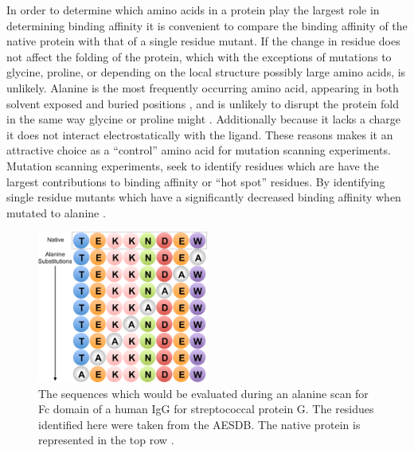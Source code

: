 In order to determine which amino acids in a protein play the largest role in determining binding affinity it is convenient to compare the binding affinity of the native protein with that of a single residue mutant.
If the change in residue does not affect the folding of the protein, which with the exceptions of mutations to glycine, proline, or depending on the local structure possibly large amino acids, is unlikely. 
Alanine is the most frequently occurring amino acid, appearing in both solvent exposed and buried positions \cite{chothia1976nature,rose1985hydrophobicity}, and is unlikely to disrupt the protein fold in the same way glycine or proline might \cite{klapper1977independent}.
Additionally because it lacks a charge it does not interact electrostatically with the ligand.
These reasons makes it an attractive choice as a ``control'' amino acid for mutation scanning experiments.
Mutation scanning experiments, seek to identify residues which are have the largest contributions to binding affinity or ``hot spot'' residues.
By identifying single residue mutants which have a significantly decreased binding affinity when mutated to alanine \cite{cunningham1989high}.
\begin{figure}[h]
\centering
\includegraphics[width=0.5\textwidth]{figures/alanine_scan.png}
\caption{The sequences which would be evaluated during an alanine scan for Fc domain of a human IgG for streptococcal protein G.
The residues identified here were taken from the AESDB.
The native protein is represented in the top row \protect\cite{sauer1995crystal,thorn2001asedb}.
}
\label{fig:alanine_scan}
\end{figure}

